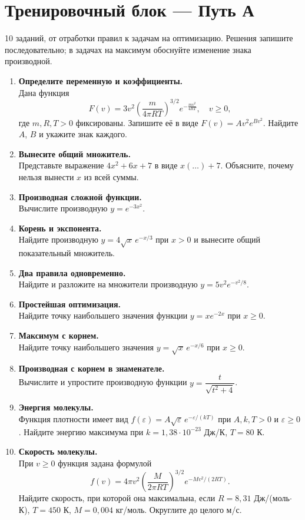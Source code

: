 \documentclass[a4paper,12pt]{article}
\newcommand{\task}[2]{\item \textbf{#1}\\[-1pt]#2}
\begin{document}
\section*{Тренировочный блок --- Путь А}
\setlength{\abovedisplayskip}{5pt}\setlength{\belowdisplayskip}{5pt}
\textcolor{subtle}{10 заданий, от отработки правил к задачам на оптимизацию. Решения запишите последовательно; в задачах на максимум обоснуйте изменение знака производной.}
\begin{enumerate}[itemsep=3pt,topsep=3pt]
\task{Определите переменную и коэффициенты.}{Дана функция
\[
F(v)=3v^2\left(\frac{m}{4\pi RT}\right)^{3/2}e^{-\frac{mv^2}{4RT}},\quad v\ge0,
\]
где $m,R,T>0$ фиксированы. Запишите её в виде $F(v)=Av^2e^{Bv^2}$. Найдите $A$, $B$ и укажите знак каждого.}
\task{Вынесите общий множитель.}{Представьте выражение $4x^2+6x+7$ в виде $x(\ldots)+7$. Объясните, почему нельзя вынести $x$ из всей суммы.}
\task{Производная сложной функции.}{Вычислите производную $y=e^{-3x^2}$.}
\task{Корень и экспонента.}{Найдите производную $y=4\sqrt{x}\,e^{-x/3}$ при $x>0$ и вынесите общий показательный множитель.}
\task{Два правила одновременно.}{Найдите и разложите на множители производную $y=5v^2e^{-v^2/8}$.}
\task{Простейшая оптимизация.}{Найдите точку наибольшего значения функции $y=xe^{-2x}$ при $x\ge0$.}
\task{Максимум с корнем.}{Найдите точку наибольшего значения $y=\sqrt{x}\,e^{-x/6}$ при $x\ge0$.}
\task{Производная с корнем в знаменателе.}{Вычислите и упростите производную функции $y=\dfrac{t}{\sqrt{t^2+4}}$.}
\task{Энергия молекулы.}{Функция плотности имеет вид $f(\varepsilon)=A\sqrt\varepsilon\,e^{-\varepsilon/(kT)}$ при $A,k,T>0$ и $\varepsilon\ge0$. Найдите энергию максимума при $k=1{,}38\cdot10^{-23}$ Дж/К, $T=80$ К.}
\task{Скорость молекулы.}{При $v\ge0$ функция задана формулой
\[
 f(v)=4\pi v^2\left(\frac{M}{2\pi RT}\right)^{3/2}e^{-Mv^2/(2RT)}.
\]
Найдите скорость, при которой она максимальна, если $R=8{,}31$ Дж/(моль$\cdot$К), $T=450$ К, $M=0{,}004$ кг/моль. Округлите до целого м/с.}
\end{enumerate}
\clearpage
\end{document}
